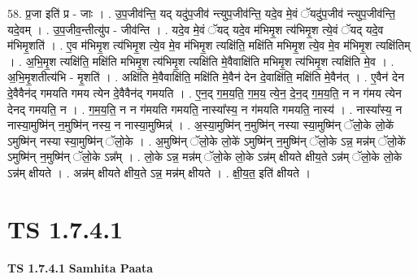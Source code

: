 \documentclass[17pt]{extarticle}
\begin{document}
58. प्र॒जा इति॑ प्र - जाः । . उ॒प॒जीव॑न्ति॒ यद् यदु॑प॒जीव॑ न्त्युप॒जीव॑न्ति॒ यदे॒व मे॒वं ॅयदु॑प॒जीव॑ न्त्युप॒जीव॑न्ति॒ यदे॒वम् । . उ॒प॒जीव॒न्तीत्यु॑प - जीव॑न्ति । . यदे॒व मे॒वं ॅयद् यदे॒व म॑भिमृ॒श त्य॑भिमृ॒श त्ये॒वं ॅयद् यदे॒व म॑भिमृ॒शति॑ । . ए॒व म॑भिमृ॒श त्य॑भिमृ॒श त्ये॒व मे॒व म॑भिमृ॒श त्यक्षि॑ति॒ मक्षि॑ति मभिमृ॒श त्ये॒व मे॒व म॑भिमृ॒श त्यक्षि॑तिम् । . अ॒भि॒मृ॒श त्यक्षि॑ति॒ मक्षि॑ति मभिमृ॒श त्य॑भिमृ॒श त्यक्षि॑ति मे॒वैवाक्षि॑ति मभिमृ॒श त्य॑भिमृ॒श त्यक्षि॑ति मे॒व । . अ॒भि॒मृ॒शतीत्य॑भि - मृ॒शति॑ । . अक्षि॑ति मे॒वैवाक्षि॑ति॒ मक्षि॑ति मे॒वैन॑ देन दे॒वाक्षि॑ति॒ मक्षि॑ति मे॒वैन॑त् । . ए॒वैन॑ देन दे॒वैवैन॑द् गमयति गमय त्येन दे॒वैवैन॑द् गमयति । . ए॒न॒द् ग॒म॒य॒ति॒ ग॒म॒य॒ त्ये॒न॒ दे॒न॒द् ग॒म॒य॒ति॒ न न ग॑मय त्येन देनद् गमयति॒ न । . ग॒म॒य॒ति॒ न न ग॑मयति गमयति॒ नास्या᳚स्य॒ न ग॑मयति गमयति॒ नास्य॑ । . नास्या᳚स्य॒ न नास्या॒मुष्मि॑न् न॒मुष्मि॑न् नस्य॒ न नास्या॒मुष्मिन्न्॑ । . अ॒स्या॒मुष्मि॑न् न॒मुष्मि॑न् नस्या स्या॒मुष्मि॑न् ॅलो॒के लो॒के॑ ऽमुष्मि॑न् नस्या स्या॒मुष्मि॑न् ॅलो॒के । . अ॒मुष्मि॑न् ॅलो॒के लो॒के॑ ऽमुष्मि॑न् न॒मुष्मि॑न् ॅलो॒के ऽन्न॒ मन्न॑म् ॅलो॒के॑ ऽमुष्मि॑न् न॒मुष्मि॑न् ॅलो॒के ऽन्न᳚म् । . लो॒के ऽन्न॒ मन्न॑म् ॅलो॒के लो॒के ऽन्न॑म् क्षीयते क्षीय॒ते ऽन्न॑म् ॅलो॒के लो॒के ऽन्न॑म् क्षीयते । . अन्न॑म् क्षीयते क्षीय॒ते ऽन्न॒ मन्न॑म् क्षीयते । . क्षी॒य॒त॒ इति॑ क्षीयते । \newline
\pagebreak
{}

\section{ TS 1.7.4.1 }

\textbf{TS 1.7.4.1 } \newline
\textbf{Samhita Paata} \newline
\end{document}
